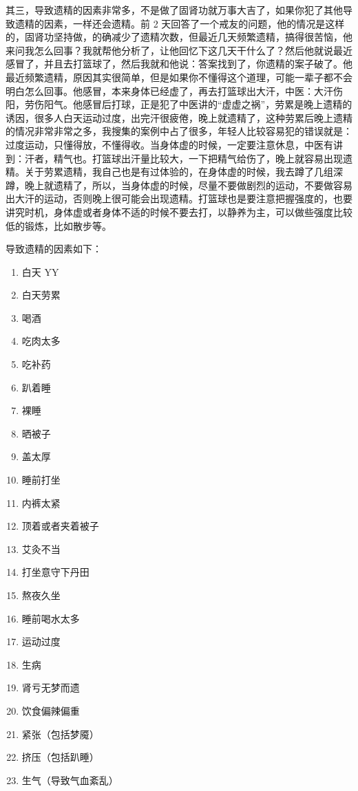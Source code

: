 \documentclass{ctexart}
\begin{document}
其三，导致遗精的因素非常多，不是做了固肾功就万事大吉了，如果你犯了其他导致遗精的因素，一样还会遗精。前 2 天回答了一个戒友的问题，他的情况是这样的，固肾功坚持做，的确减少了遗精次数，但最近几天频繁遗精，搞得很苦恼，他来问我怎么回事？我就帮他分析了，让他回忆下这几天干什么了？然后他就说最近感冒了，并且去打篮球了，然后我就和他说：答案找到了，你遗精的案子破了。他最近频繁遗精，原因其实很简单，但是如果你不懂得这个道理，可能一辈子都不会明白怎么回事。他感冒，本来身体已经虚了，再去打篮球出大汗，中医：大汗伤阳，劳伤阳气。他感冒后打球，正是犯了中医讲的“虚虚之祸”，劳累是晚上遗精的诱因，很多人白天运动过度，出完汗很疲倦，晚上就遗精了，这种劳累后晚上遗精的情况非常非常之多，我搜集的案例中占了很多，年轻人比较容易犯的错误就是：过度运动，只懂得放，不懂得收。当身体虚的时候，一定要注意休息，中医有讲到：汗者，精气也。打篮球出汗量比较大，一下把精气给伤了，晚上就容易出现遗精。关于劳累遗精，我自己也是有过体验的，在身体虚的时候，我去蹲了几组深蹲，晚上就遗精了，所以，当身体虚的时候，尽量不要做剧烈的运动，不要做容易出大汗的运动，否则晚上很可能会出现遗精。打篮球也是要注意把握强度的，也要讲究时机，身体虚或者身体不适的时候不要去打，以静养为主，可以做些强度比较低的锻炼，比如散步等。

导致遗精的因素如下：

\begin{enumerate}
    \item 白天 YY
    \item 白天劳累
    \item 喝酒
    \item 吃肉太多
    \item 吃补药
    \item 趴着睡
    \item 裸睡
    \item 晒被子
    \item 盖太厚
    \item 睡前打坐
    \item 内裤太紧
    \item 顶着或者夹着被子
    \item 艾灸不当
    \item 打坐意守下丹田
    \item 熬夜久坐
    \item 睡前喝水太多
    \item 运动过度
    \item 生病
    \item 肾亏无梦而遗
    \item 饮食偏辣偏重
    \item 紧张（包括梦魇）
    \item 挤压（包括趴睡）
    \item 生气（导致气血紊乱）
\end{enumerate}
\end{document}
